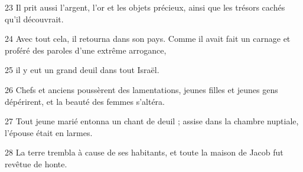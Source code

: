 
23 Il prit aussi l’argent, l’or et les objets précieux, ainsi que les trésors cachés qu’il découvrait.

24 Avec tout cela, il retourna dans son pays. Comme il avait fait un carnage et proféré des paroles d’une extrême arrogance,

25 il y eut un grand deuil dans tout Israël.

26 Chefs et anciens poussèrent des lamentations, jeunes filles et jeunes gens dépérirent, et la beauté des femmes s’altéra.

27 Tout jeune marié entonna un chant de deuil ; assise dans la chambre nuptiale, l’épouse était en larmes.

28 La terre trembla à cause de ses habitants, et toute la maison de Jacob fut revêtue de honte.
